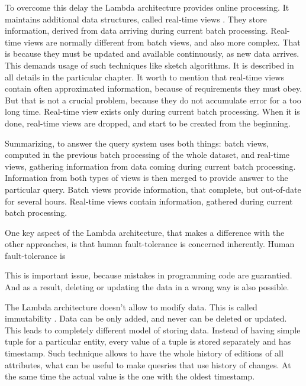 To overcome this delay the Lambda architecture provides online processing.
It maintains additional data structures, called real-time views .
They store information, derived from data arriving during current batch
processing.
Real-time views are normally different from batch views, and also more complex.
That is because they must be updated and available continuously, as new data
arrives.
This demands usage of such techniques like sketch algorithms.
It is described in all details in the particular chapter.
It worth to mention that real-time views contain often approximated information,
because of requirements they must obey.
But that is not a crucial problem, because they do not accumulate error for a
too long time.
Real-time view exists only during current batch processing.
When it is done, real-time views are dropped, and start to be created from the
beginning.

Summarizing, to answer the query system uses both things: batch views, computed
in the previous batch processing of the whole dataset, and real-time views,
gathering information from data coming during current batch processing.
Information from both types of views is then merged to provide answer to the
particular query.
Batch views provide information, that complete, but out-of-date for
several hours.
Real-time views contain information, gathered during current batch processing.

One key aspect of the Lambda architecture, that makes a difference with the
other approaches, is that human fault-tolerance is concerned inherently.
Human fault-tolerance  is

This is important issue, because mistakes in programming code are guarantied.
And as a result, deleting or updating the data in a wrong way is also possible.

The Lambda architecture doesn't allow to modify data. This is called
immutability .
Data can be only added, and never can be deleted or updated.
This leads to completely different model of storing data.
Instead of having simple tuple for a particular entity, every value of a tuple
is stored separately and has timestamp.
Such technique allows to have the whole history of editions of all attributes, what can be useful to make quesries that use history of changes.
At the same time the actual value is the one with the oldest timestamp.


